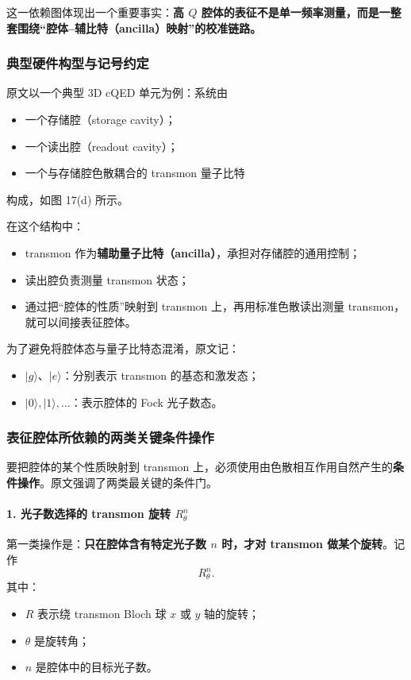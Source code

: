 \documentclass[12pt,a4paper,oneside]{ctexbook}
\begin{document}
这一依赖图体现出一个重要事实：\textbf{高 \(Q\) 腔体的表征不是单一频率测量，而是一整套围绕“腔体--辅比特（ancilla）映射”的校准链路。}

\subsubsection{典型硬件构型与记号约定}

原文以一个典型 3D cQED 单元为例：系统由
\begin{itemize}
    \item 一个存储腔（storage cavity）；
    \item 一个读出腔（readout cavity）；
    \item 一个与存储腔色散耦合的 transmon 量子比特
\end{itemize}
构成，如图 17(d) 所示。

在这个结构中：
\begin{itemize}
    \item transmon 作为\textbf{辅助量子比特（ancilla）}，承担对存储腔的通用控制；
    \item 读出腔负责测量 transmon 状态；
    \item 通过把“腔体的性质”映射到 transmon 上，再用标准色散读出测量 transmon，就可以间接表征腔体。
\end{itemize}

为了避免将腔体态与量子比特态混淆，原文记：
\begin{itemize}
    \item \(|g\rangle\)、\(|e\rangle\)：分别表示 transmon 的基态和激发态；
    \item \(|0\rangle,|1\rangle,\ldots\)：表示腔体的 Fock 光子数态。
\end{itemize}

\subsubsection{表征腔体所依赖的两类关键条件操作}

要把腔体的某个性质映射到 transmon 上，必须使用由色散相互作用自然产生的\textbf{条件操作}。原文强调了两类最关键的条件门。

\paragraph{1. 光子数选择的 transmon 旋转 \(R_\theta^n\)}
第一类操作是：\textbf{只在腔体含有特定光子数 \(n\) 时，才对 transmon 做某个旋转}。记作
\[
R_\theta^n.
\]
其中：
\begin{itemize}
    \item \(R\) 表示绕 transmon Bloch 球 \(x\) 或 \(y\) 轴的旋转；
    \item \(\theta\) 是旋转角；
    \item \(n\) 是腔体中的目标光子数。
\end{itemize}
\end{document}
